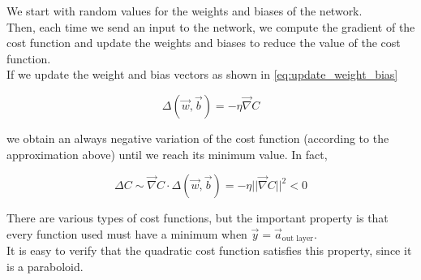 \noindent
We start with random values for the weights and biases of the network. \\
Then, each time we send an input to the network, we compute the gradient of the cost function and update the weights and biases to reduce the value of the cost function. \\
If we update the weight and bias vectors as shown in \cref{eq:update_weight_bias}

\begin{equation}
    \Delta (\vec{w}, \vec{b}) = - \eta \vec{\nabla} C
    \label{eq:update_weight_bias}
\end{equation}

\noindent
we obtain an always negative variation of the cost function (according to the approximation above) until we reach its minimum value. In fact,

\[
    \Delta C \sim \vec{\nabla} C \cdot \Delta (\vec{w}, \vec{b}) = - \eta 
    || \vec{\nabla} C || ^ 2 < 0 
\]

\noindent
There are various types of cost functions, but the important property is that every function used must have a minimum when \(\vec{y} = \vec{a}_{\text{out layer}}\). \\
It is easy to verify that the quadratic cost function satisfies this property, since it is a paraboloid.
